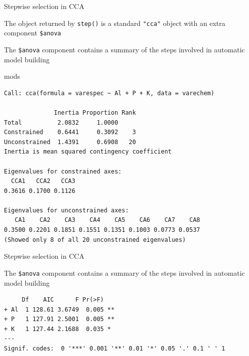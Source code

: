 \documentclass[10pt,ignorenonframetext,compress, aspectratio=169]{beamer}
\newenvironment{Shaded}{\begin{snugshade}}{\end{snugshade}}
\newcommand{\NormalTok}[1]{{#1}}
\begin{document}
\begin{frame}[fragile]{Stepwise selection in CCA}

The object returned by \texttt{step()} is a standard \texttt{"cca"}
object with an extra component \texttt{\$anova}

The \texttt{\$anova} component contains a summary of the steps involved
in automatic model building

\tiny

\begin{Shaded}
\begin{Highlighting}[]
\NormalTok{mods}
\end{Highlighting}
\end{Shaded}

\begin{verbatim}
Call: cca(formula = varespec ~ Al + P + K, data = varechem)

              Inertia Proportion Rank
Total          2.0832     1.0000     
Constrained    0.6441     0.3092    3
Unconstrained  1.4391     0.6908   20
Inertia is mean squared contingency coefficient 

Eigenvalues for constrained axes:
  CCA1   CCA2   CCA3 
0.3616 0.1700 0.1126 

Eigenvalues for unconstrained axes:
   CA1    CA2    CA3    CA4    CA5    CA6    CA7    CA8 
0.3500 0.2201 0.1851 0.1551 0.1351 0.1003 0.0773 0.0537 
(Showed only 8 of all 20 unconstrained eigenvalues)
\end{verbatim}

\normalsize

\end{frame}

\begin{frame}[fragile]{Stepwise selection in CCA}

The \texttt{\$anova} component contains a summary of the steps involved
in automatic model building

\scriptsize

\begin{Shaded}
\end{Shaded}

\begin{verbatim}
     Df    AIC      F Pr(>F)   
+ Al  1 128.61 3.6749  0.005 **
+ P   1 127.91 2.5001  0.005 **
+ K   1 127.44 2.1688  0.035 * 
---
Signif. codes:  0 '***' 0.001 '**' 0.01 '*' 0.05 '.' 0.1 ' ' 1
\end{verbatim}

\normalsize

\end{frame}
\end{document}
